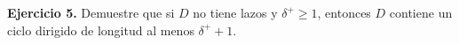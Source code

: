 \textbf{Ejercicio 5.} Demuestre que si $D$ no tiene lazos y $\delta^+ \ge 1$, entonces 
$D$ contiene un ciclo dirigido de longitud al menos $\delta^+ + 1$.